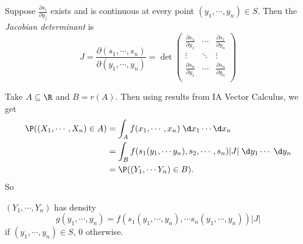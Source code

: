 \documentclass[a4paper]{article}
\begin{document}
\begin{defi}
  Suppose $\frac{\partial s_i}{\partial y_j}$ exists and is continuous at every point $(y_1, \cdots, y_n)\in S$. Then the \emph{Jacobian determinant} is
  \[
    J = \frac{\partial (s_1, \cdots, s_n)}{\partial (y_1, \cdots, y_n)} =
    \det
    \begin{pmatrix}
      \frac{\partial s_1}{\partial y_1} & \cdots & \frac{\partial s_1}{\partial y_n}\\
      \vdots & \ddots & \vdots\\
      \frac{\partial s_n}{\partial y_1} & \cdots & \frac{\partial s_n}{\partial y_n}\\
    \end{pmatrix}
  \]
\end{defi}
Take $A\subseteq \R$ and $B = r(A)$. Then using results from IA Vector Calculus, we get
\begin{align*}
  \P((X_1, \cdots, X_n)\in A) &= \int_A f(x_1, \cdots, x_n) \;\d x_1\cdots \d x_n\\
  &= \int_B f(s_1(y_1, \cdots y_n), s_2, \cdots, s_n) |J|\;\d y_1\cdots \;\d y_n\\
  &= \P((Y_1, \cdots Y_n)\in B).
\end{align*}
So
\begin{prop}
  $(Y_1, \cdots, Y_n)$ has density
  \[
    g(y_1, \cdots, y_n) = f(s_1(y_1, \cdots, y_n), \cdots s_n(y_1, \cdots, y_n))|J|
  \]
  if $(y_1,  \cdots, y_n)\in S$, $0$ otherwise.
\end{prop}
\end{document}
